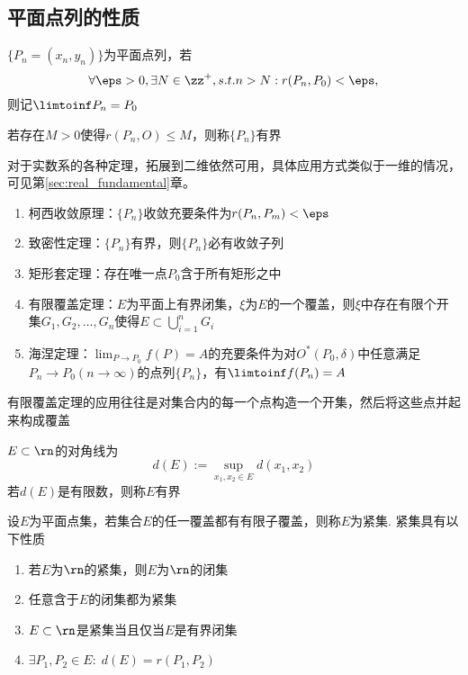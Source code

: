\subsection{平面点列的性质}
\begin{definition}[平面点列的极限]
$\{P_n=(x_n,y_n)\}$为平面点列，若
\[\forall \eps>0,\exists N\in\zz^+,s.t. n>N:r(P_n,P_0)<\eps,\]
则记$\limtoinf P_n=P_0$
\end{definition}
\begin{definition}[有界]
若存在$M>0$使得$r(P_n,O)\leq M$，则称$\{P_n\}$有界
\end{definition}
对于实数系的各种定理，拓展到二维依然可用，具体应用方式类似于一维的情况，可见第\ref{sec:real_fundamental}章。
\begin{theorem}
\begin{enumerate}
	\item 柯西收敛原理：$\{P_n\}$收敛充要条件为$r(P_n,P_m)<\eps$
	\item 致密性定理：$\{P_n\}$有界，则$\{P_n\}$必有收敛子列
	\item 矩形套定理：存在唯一点$P_0$含于所有矩形之中
	\item 有限覆盖定理：$E$为平面上有界闭集，$\xi$为$E$的一个覆盖，则$\xi$中存在有限个开集$G_1,G_2,\ldots,G_n$使得$E\subset \bigcup_{i=1}^n G_i$
	\item 海涅定理：$\lim_{P\to P_0}f(P)=A$的充要条件为对$O^*(P_0,\delta)$中任意满足$P_n\to P_0(n\to\infty)$的点列$\{P_n\}$，有$\limtoinf f(P_n)=A$
\end{enumerate}
有限覆盖定理的应用往往是对集合内的每一个点构造一个开集，然后将这些点并起来构成覆盖
\end{theorem}
\begin{definition}[对角线]
$E\subset \rn$的对角线为
\[d(E):=\sup_{x_1,x_2\in E}d(x_1,x_2)\]
若$d(E)$是有限数，则称$E$有界
\end{definition}
\begin{definition}[紧集]
设$E$为平面点集，若集合$E$的任一覆盖都有有限子覆盖，则称$E$为紧集.
紧集具有以下性质
\begin{enumerate}
	\item 若$E$为$\rn$的紧集，则$E$为$\rn$的闭集
	\item 任意含于$E$的闭集都为紧集
	\item $E\subset\rn$是紧集当且仅当$E$是有界闭集
	\item $\exists P_1,P_2\in E:\;d(E)=r(P_1,P_2)$
\end{enumerate}
\end{definition}
